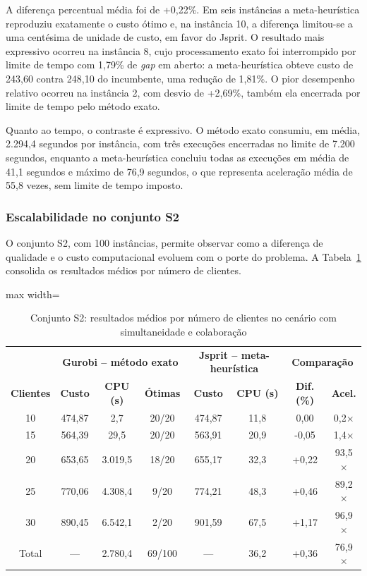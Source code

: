 \documentclass[a4paper,12pt]{article}
\begin{document}
A diferença percentual média foi de +0,22\%. Em seis instâncias a meta-heurística reproduziu exatamente o custo ótimo e, na instância 10, a diferença limitou-se a uma centésima de unidade de custo, em favor do Jsprit. O resultado mais expressivo ocorreu na instância 8, cujo processamento exato foi interrompido por limite de tempo com 1,79\% de \textit{gap} em aberto: a meta-heurística obteve custo de 243,60 contra 248,10 do incumbente, uma redução de 1,81\%. O pior desempenho relativo ocorreu na instância 2, com desvio de +2,69\%, também ela encerrada por limite de tempo pelo método exato.

Quanto ao tempo, o contraste é expressivo. O método exato consumiu, em média, 2.294,4 segundos por instância, com três execuções encerradas no limite de 7.200 segundos, enquanto a meta-heurística concluiu todas as execuções em média de 41,1 segundos e máximo de 76,9 segundos, o que representa aceleração média de 55,8 vezes, sem limite de tempo imposto.

\subsubsection{Escalabilidade no conjunto S2}
O conjunto S2, com 100 instâncias, permite observar como a diferença de qualidade e o custo computacional evoluem com o porte do problema. A Tabela~\ref{tab:3} consolida os resultados médios por número de clientes.

\begin{table}[H]
    \centering
    \caption{Conjunto S2: resultados médios por número de clientes no cenário com simultaneidade e colaboração}
    \label{tab:3}
    \vspace{0.2cm}
    \footnotesize
    \setlength{\tabcolsep}{4pt}
    \begin{adjustbox}{max width=\textwidth}
    \begin{tabular}{c | c c c | c c | c c}
        \toprule
         & \multicolumn{3}{c|}{\textbf{Gurobi -- método exato}} & \multicolumn{2}{c|}{\textbf{Jsprit -- meta-heurística}} & \multicolumn{2}{c}{\textbf{Comparação}} \\
        \textbf{Clientes} & \textbf{Custo} & \textbf{CPU (s)} & \textbf{Ótimas} & \textbf{Custo} & \textbf{CPU (s)} & \textbf{Dif. (\%)} & \textbf{Acel.} \\
        \midrule
        10 & 474,87 & 2,7 & 20/20 & 474,87 & 11,8 & 0,00 & 0,2$\times$ \\
        15 & 564,39 & 29,5 & 20/20 & 563,91 & 20,9 & -0,05 & 1,4$\times$ \\
        20 & 653,65 & 3.019,5 & 18/20 & 655,17 & 32,3 & +0,22 & 93,5$\times$ \\
        25 & 770,06 & 4.308,4 & 9/20 & 774,21 & 48,3 & +0,46 & 89,2$\times$ \\
        30 & 890,45 & 6.542,1 & 2/20 & 901,59 & 67,5 & +1,17 & 96,9$\times$ \\
        Total & --- & 2.780,4 & 69/100 & --- & 36,2 & +0,36 & 76,9$\times$ \\
        \bottomrule
    \end{tabular}
    \end{adjustbox}
\end{table}
\end{document}
